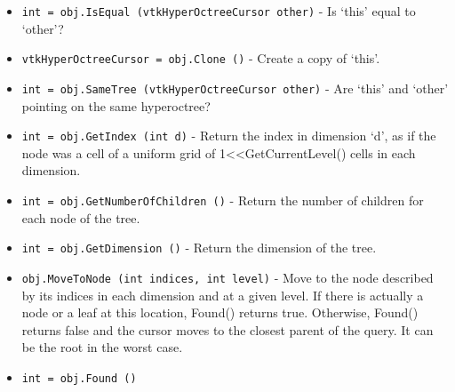 \begin{itemize}
 
 

\item  \verb|int = obj.IsEqual (vtkHyperOctreeCursor other)| -  Is `this' equal to `other'?
 
 

\item  \verb|vtkHyperOctreeCursor = obj.Clone ()| -  Create a copy of `this'.
 
 

\item  \verb|int = obj.SameTree (vtkHyperOctreeCursor other)| -  Are `this' and `other' pointing on the same hyperoctree?
 

\item  \verb|int = obj.GetIndex (int d)| -  Return the index in dimension `d', as if the node was a cell of a
 uniform grid of 1<<GetCurrentLevel() cells in each dimension.
 
 

\item  \verb|int = obj.GetNumberOfChildren ()| -  Return the number of children for each node of the tree.
 

\item  \verb|int = obj.GetDimension ()| -  Return the dimension of the tree.
 

\item  \verb|obj.MoveToNode (int indices, int level)| -  Move to the node described by its indices in each dimension and
 at a given level. If there is actually a node or a leaf at this
 location, Found() returns true. Otherwise, Found() returns false and the
 cursor moves to the closest parent of the query. It can be the root in the
 worst case.
 
 
 

\item  \verb|int = obj.Found ()|

\end{itemize}
